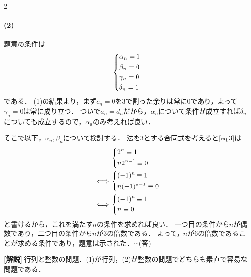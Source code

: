\documentclass[../../main.tex]{subfiles}
\begin{document}
\begin{multicols}{2}
  \paragraph{(2)}
  題意の条件は
  \begin{align}
    \begin{dcases}
      \alpha_n = 1 \\
      \beta_n =  0 \\
      \gamma_n = 0 \\
      \delta_n = 1
    \end{dcases}\label{eq:3}
  \end{align}
  である．
  (1)の結果より，まず$c_n=0$を$3$で割った余りは常に$0$であり，よって$\gamma_n=0$は常に成り立つ．
  ついで$a_n=d_n$だから，$\alpha_n$について条件が成立すれば$\delta_n$についても成立するので，$\alpha_n$のみ考えれば良い．

  そこで以下，$\alpha_n,\beta_n$について検討する．
  法を$3$とする合同式を考えると\cref{eq:3}は
  \begin{align}
    &
    \begin{dcases}
      2^{n} \equiv 1 \\
      n2^{n-1} \equiv 0
    \end{dcases}    \\
    \iff
    &
    \begin{dcases}
      (-1)^{n} \equiv 1 \\
      n(-1)^{n-1} \equiv 0
    \end{dcases} \\
    \iff
    &
    \begin{dcases}
      (-1)^{n} \equiv 1 \\
      n \equiv 0
    \end{dcases}
  \end{align}
  と書けるから，これを満たす$n$の条件を求めれば良い．
  一つ目の条件から$n$が偶数であり，二つ目の条件から$n$が$3$の倍数である．
  よって，$n$が$6$の倍数であることが求める条件であり，題意は示された．$\cdots$(答)

  {\bf [解説]}
  行列と整数の問題．(1)が行列，(2)が整数の問題でどちらも素直で容易な問題である．


\end{multicols}
\end{document}

